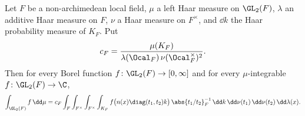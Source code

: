 Let $F$ be a non-archimedean local field, $\mu$ a left Haar measure on $\GL_2(F)$, $\lambda$ an additive Haar measure
on $F$, $\nu$ a Haar measure on $F^\times$, and $\dd k$ the Haar probability measure of $K_F$. Put
\[
  c_F=\frac{\mu(K_F)}{\lambda(\Ocal_F)\,\nu(\Ocal_F^\times)^2}.
\]
Then for every Borel function $f\colon\GL_2(F)\to[0,\infty]$ and for every $\mu$-integrable $f\colon\GL_2(F)\to\C$,
\[
  \int_{\GL_2(F)}f\,\dd\mu=c_F\int_F\int_{F^\times}\int_{F^\times}\int_{K_F}
  f\bigl(n(x)\diag(t_1,t_2)k\bigr)\,\abs{t_1/t_2}_F^{-1}\,\dd k\,\dd\nu(t_1)\,\dd\nu(t_2)\,\dd\lambda(x).
\]
